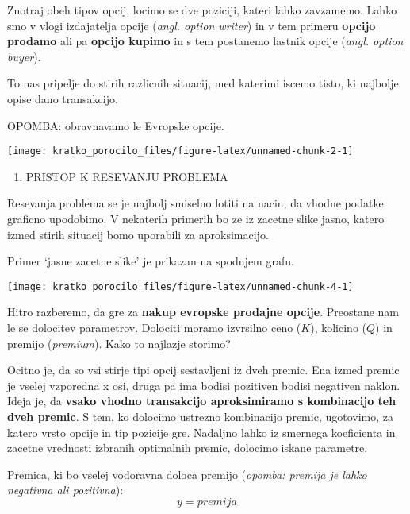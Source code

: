 \documentclass[
]{article}
\providecommand{\tightlist}{%
  \setlength{\itemsep}{0pt}\setlength{\parskip}{0pt}}
\begin{document}
Znotraj obeh tipov opcij, locimo se dve poziciji, kateri lahko
zavzamemo. Lahko smo v vlogi izdajatelja opcije (\emph{angl. option
writer}) in v tem primeru \textbf{opcijo prodamo} ali pa \textbf{opcijo
kupimo} in s tem postanemo lastnik opcije (\emph{angl. option buyer}).

To nas pripelje do stirih razlicnih situacij, med katerimi iscemo tisto,
ki najbolje opise dano transakcijo.

OPOMBA: obravnavamo le Evropske opcije.

\begin{center}\texttt{[image: kratko\_porocilo\_files/figure-latex/unnamed-chunk-2-1]} \end{center}

\begin{enumerate}
\def\labelenumi{\arabic{enumi}.}
\setcounter{enumi}{1}
\tightlist
\item
  PRISTOP K RESEVANJU PROBLEMA
\end{enumerate}

Resevanja problema se je najbolj smiselno lotiti na nacin, da vhodne
podatke graficno upodobimo. V nekaterih primerih bo ze iz zacetne slike
jasno, katero izmed stirih situacij bomo uporabili za aproksimacijo.

Primer `jasne zacetne slike' je prikazan na spodnjem grafu.

\begin{center}\texttt{[image: kratko\_porocilo\_files/figure-latex/unnamed-chunk-4-1]} \end{center}

Hitro razberemo, da gre za \textbf{nakup evropske prodajne opcije}.
Preostane nam le se dolocitev parametrov. Dolociti moramo izvrsilno ceno
(\(K\)), kolicino (\(Q\)) in premijo (\emph{premium}). Kako to najlazje
storimo?

Ocitno je, da so vsi stirje tipi opcij sestavljeni iz dveh premic. Ena
izmed premic je vselej vzporedna x osi, druga pa ima bodisi pozitiven
bodisi negativen naklon. Ideja je, da \textbf{vsako vhodno transakcijo
aproksimiramo s kombinacijo teh dveh premic}. S tem, ko dolocimo
ustrezno kombinacijo premic, ugotovimo, za katero vrsto opcije in tip
pozicije gre. Nadaljno lahko iz smernega koeficienta in zacetne
vrednosti izbranih optimalnih premic, dolocimo iskane parametre.

Premica, ki bo vselej vodoravna doloca premijo (\emph{opomba: premija je
lahko negativna ali pozitivna}): \[ y =  premija \]
\end{document}
